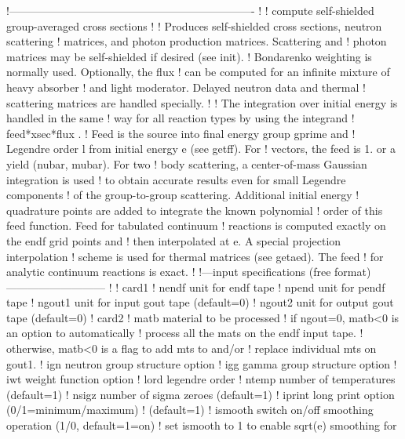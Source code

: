 \small
\begin{ccode}

   !-------------------------------------------------------------------
   !
   ! compute self-shielded group-averaged cross sections
   !
   ! Produces self-shielded cross sections, neutron scattering
   ! matrices, and photon production matrices.  Scattering and
   ! photon matrices may be self-shielded if desired (see init).
   ! Bondarenko weighting is normally used.   Optionally, the flux
   ! can be computed for an infinite mixture of heavy absorber
   ! and light moderator.  Delayed neutron data and thermal
   ! scattering matrices are handled specially.
   !
   ! The integration over initial energy is handled in the same
   ! way for all reaction types by using the integrand
   !                   feed*xsec*flux                   .
   ! Feed is the source into final energy group gprime and
   ! Legendre order l from initial energy e (see getff).  For
   ! vectors, the feed is 1. or a yield (nubar, mubar).  For two
   ! body scattering, a center-of-mass Gaussian integration is used
   ! to obtain accurate results even for small Legendre components
   ! of the group-to-group scattering.  Additional initial energy
   ! quadrature points are added to integrate the known polynomial
   ! order of this feed function.  Feed for tabulated continuum
   ! reactions is computed exactly on the endf grid points and
   ! then interpolated at e.  A special projection interpolation
   ! scheme is used for thermal matrices (see getaed).  The feed
   ! for analytic continuum reactions is exact.
   !
   !---input specifications (free format)---------------------------
   !
   ! card1
   !    nendf   unit for endf tape
   !    npend   unit for pendf tape
   !    ngout1  unit for input gout tape (default=0)
   !    ngout2  unit for output gout tape (default=0)
   ! card2
   !    matb    material to be processed
   !             if ngout=0, matb<0 is an option to automatically
   !              process all the mats on the endf input tape.
   !             otherwise, matb<0 is a flag to add mts to and/or
   !              replace individual mts on gout1.
   !    ign     neutron group structure option
   !    igg     gamma group structure option
   !    iwt     weight function option
   !    lord    legendre order
   !    ntemp   number of temperatures (default=1)
   !    nsigz   number of sigma zeroes (default=1)
   !    iprint  long print option (0/1=minimum/maximum)
   !            (default=1)
   !    ismooth switch on/off smoothing operation (1/0, default=1=on)
   !            set ismooth to 1 to enable sqrt(e) smoothing for

\end{ccode}
